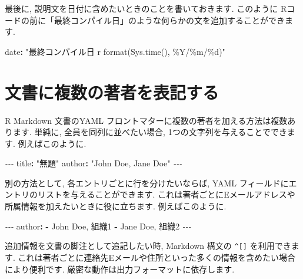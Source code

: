\documentclass[
  11pt,
  lualatex,
  ja=standard]{bxjsreport}
\newenvironment{Shaded}{\begin{snugshade}}{\end{snugshade}}
\newcommand{\AttributeTok}[1]{\textcolor[rgb]{0.77,0.63,0.00}{#1}}
\newcommand{\FunctionTok}[1]{\textcolor[rgb]{0.00,0.00,0.00}{#1}}
\newcommand{\KeywordTok}[1]{\textcolor[rgb]{0.13,0.29,0.53}{\textbf{#1}}}
\newcommand{\PreprocessorTok}[1]{\textcolor[rgb]{0.56,0.35,0.01}{\textit{#1}}}
\newcommand{\StringTok}[1]{\textcolor[rgb]{0.31,0.60,0.02}{#1}}
\begin{document}
最後に, 説明文を日付に含めたいときのことを書いておきます. このように Rコードの前に「最終コンパイル日」のような何らかの文を追加することができます.

\begin{Shaded}
\begin{Highlighting}[]
\FunctionTok{date}\KeywordTok{:}\AttributeTok{ }\StringTok{"最終コンパイル日 \textasciigrave{}r format(Sys.time(), \textquotesingle{}\%Y/\%m/\%d\textquotesingle{})\textasciigrave{}"}
\end{Highlighting}
\end{Shaded}

\hypertarget{multiple-authors}{%
\section{文書に複数の著者を表記する}\label{multiple-authors}}

R Markdown 文書のYAML フロントマターに複数の著者を加える方法は複数あります. 単純に, 全員を同列に並べたい場合, 1つの文字列を与えることでできます. 例えばこのように.

\begin{Shaded}
\begin{Highlighting}[]
\PreprocessorTok{{-}{-}{-}}
\FunctionTok{title}\KeywordTok{:}\AttributeTok{ }\StringTok{"無題"}
\FunctionTok{author}\KeywordTok{:}\AttributeTok{ }\StringTok{"John Doe, Jane Doe"}
\PreprocessorTok{{-}{-}{-}}
\end{Highlighting}
\end{Shaded}

別の方法として, 各エントリごとに行を分けたいならば, YAML フィールドにエントリのリストを与えることができます. これは著者ごとにEメールアドレスや所属情報を加えたいときに役に立ちます. 例えばこのように.

\begin{Shaded}
\begin{Highlighting}[]
\PreprocessorTok{{-}{-}{-}}
\FunctionTok{author}\KeywordTok{:}
\AttributeTok{  }\KeywordTok{{-}}\AttributeTok{ John Doe, 組織1}
\AttributeTok{  }\KeywordTok{{-}}\AttributeTok{ Jane Doe, 組織2}
\PreprocessorTok{{-}{-}{-}}
\end{Highlighting}
\end{Shaded}

追加情報を文書の脚注として追記したい時, Markdown 構文の \texttt{\^{}{[}{]}} を利用できます. これは著者ごとに連絡先Eメールや住所といった多くの情報を含めたい場合により便利です. 厳密な動作は出力フォーマットに依存します.
\end{document}
